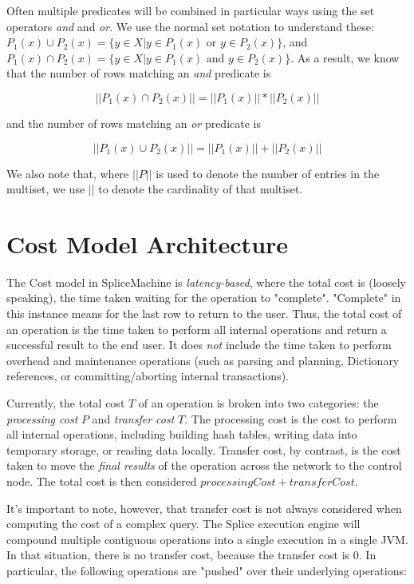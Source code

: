 \documentclass[10pt]{amsart}
\begin{document}
Often multiple predicates will be combined in particular ways using the set operators \emph{and} and \emph{or}. We use the normal set notation to understand these: $P_1(x) \cup P_2(x)  = \lbrace y \in X | y \in P_1(x) \text{ or } y \in P_2(x) \rbrace$, and $P_1(x) \cap P_2(x) = \lbrace y \in X | y \in P_1(x) \text{ and } y \in P_2(x) \rbrace$. As a result, we know that the number of rows matching an \emph{and} predicate is 

\begin{equation*}
||P_1(x) \cap P_2(x)|| = ||P_1(x)||*||P_2(x)||
\end{equation*}

and the number of rows matching an \emph{or} predicate is

\begin{equation*}
||P_1(x) \cup P_2(x)|| = ||P_1(x)||+||P_2(x)||
\end{equation*}

We also note that, where $||P||$ is used  to denote the number of entries in the multiset, we use $||$ to denote the cardinality of that multiset.

\section{Cost Model Architecture}
The Cost model in SpliceMachine is \emph{latency-based}, where the total cost is (loosely speaking), the time taken waiting for the operation to "complete". "Complete" in this instance means for the last row to return to the user. Thus, the total cost of an operation is the time taken to perform all internal operations and return a successful result to the end user. It does \emph{not} include the time taken to perform overhead and maintenance operations (such as parsing and planning, Dictionary references, or committing/aborting internal transactions).

Currently, the total cost $T$ of an operation is broken into two categories: the \emph{processing cost} $P$ and \emph{transfer cost}  $T$. The processing cost is the cost to perform all internal operations, including building hash tables, writing data into temporary storage, or reading data locally.  Transfer cost, by contrast, is the cost taken to move the \emph{final results} of the operation across the network to the control node. The total cost is then considered $processingCost + transferCost$.

It's important to note, however, that transfer cost is not always considered when computing the cost of a complex query. The Splice execution engine will compound multiple contiguous operations into a single execution in a single JVM. In that situation, there is no transfer cost, because the transfer cost is 0. In particular, the following operations are "pushed" over their underlying operations:
\end{document}
